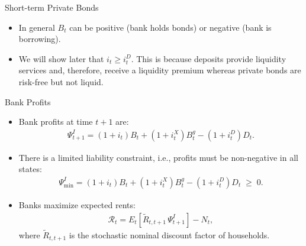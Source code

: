 \documentclass[11pt,aspectratio=169]{beamer}
\begin{document}
\begin{frame}{Short-term Private Bonds}
    \begin{itemize}
        \item In general $B_t$ can be positive (bank holds bonds) or negative (bank is borrowing). 
        \vspace{0.5cm}
        \item We will show later that $i_t \ge i_t^D$. This is because deposits provide liquidity services and, therefore, receive a liquidity premium whereas private bonds are risk-free but not liquid. 
    \end{itemize}
\end{frame}

\begin{frame}{Bank Profits}
  \begin{itemize}
    \item Bank profits at time $t+1$ are:
\begin{align}
    \Psi_{t+1}^I
      = (1+i_t) B_t
        + (1+i_t^X) B_t^g
        - (1+i_t^D) D_t. \label{8.2}
\end{align}
    \item There is a limited liability constraint, i.e., profits must be non-negative in all states:
\begin{align}
    \Psi_{\min}^I
      = (1+i_t) B_t
        + (1+i_t^X) B_t^g
        - (1+i_t^D) D_t
      \;\ge\; 0.\label{8.3}
\end{align}
    \item Banks maximize expected rents:
\begin{align}
   \mathcal{R}_t
      = E_t\!\left[ \tilde{R}_{t,t+1}\,\Psi_{t+1}^I \right] - N_t,\label{8.4} 
\end{align}
    where $\tilde{R}_{t,t+1}$ is the stochastic nominal discount factor of households.
  \end{itemize}
\end{frame}
\end{document}

